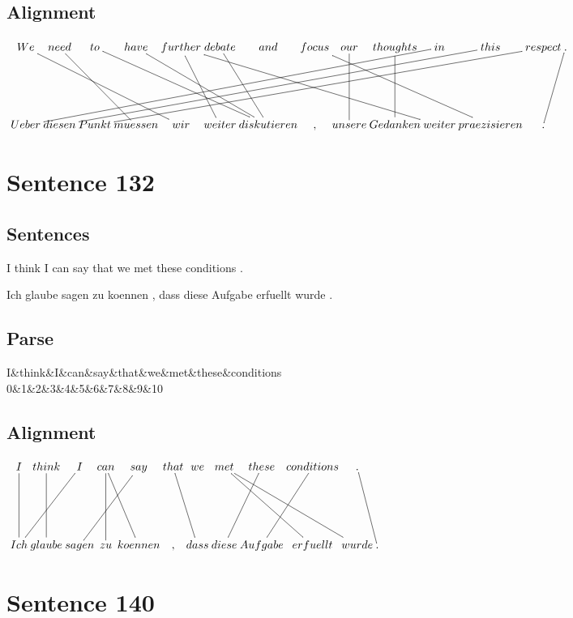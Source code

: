 \documentclass{report}
\begin{document}
\subsection*{Alignment}
\scriptsize{
$
\xymatrix@C-2.3pc{
We \ar @{-} [ddrrrr] & need \ar @{-} [ddrr] & to \ar @{-} [ddrrrr] & have \ar @{-} [ddrrr] & further \ar @{-} [ddrrrrrr] \ar @{-} [ddr] & debate \ar @{-} [ddr] & and & focus \ar @{-} [ddrrrr] & our \ar @{-} [dd] & thoughts \ar @{-} [dd] & in \ar @{-} [ddllllllllll] & this \ar @{-} [ddllllllllll] & respect \ar @{-} [ddllllllllll] & . \ar @{-} [ddl]\\\\
Ueber & diesen & Punkt & muessen & wir & weiter & diskutieren & , & unsere & Gedanken & weiter & praezisieren & .
}$}
\newpage\section*{Sentence 132}

\subsection*{Sentences}
I think I can say that we met these conditions .

\noindent Ich glaube sagen zu koennen , dass diese Aufgabe erfuellt wurde .



\subsection*{Parse}
\begin{dependency}[theme=simple]
\begin{deptext}[column sep=.5cm, row sep=.1ex]
I\&think\&I\&can\&say\&that\&we\&met\&these\&conditions\\
0\&1\&2\&3\&4\&5\&6\&7\&8\&9\&10\\
\end{deptext}
\end{dependency}


\subsection*{Alignment}
\scriptsize{
$
\xymatrix@C-2.3pc{
I \ar @{-} [dd] & think \ar @{-} [dd] & I \ar @{-} [ddll] & can \ar @{-} [dd] \ar @{-} [ddr] & say \ar @{-} [ddll] & that \ar @{-} [ddr] & we & met \ar @{-} [ddrrr] \ar @{-} [ddrr] & these \ar @{-} [ddl] & conditions \ar @{-} [ddl] & . \ar @{-} [ddr]\\\\
Ich & glaube & sagen & zu & koennen & , & dass & diese & Aufgabe & erfuellt & wurde & .
}$}
\newpage\section*{Sentence 140}
\end{document}
